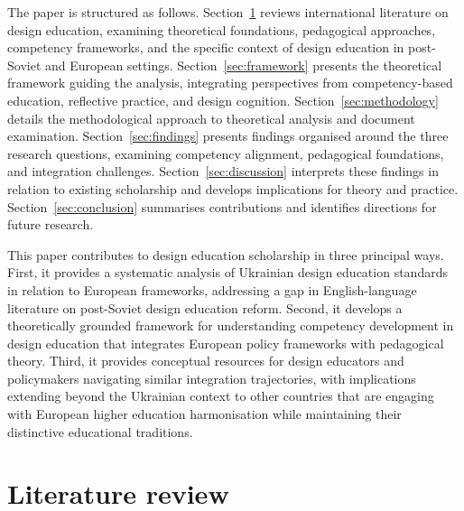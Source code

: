 \documentclass[ed]{acnsart}
\begin{document}
	The paper is structured as follows. Section~\ref{sec:literature} reviews international literature on design education, examining theoretical foundations, pedagogical approaches, competency frameworks, and the specific context of design education in post-Soviet and European settings. Section~\ref{sec:framework} presents the theoretical framework guiding the analysis, integrating perspectives from competency-based education, reflective practice, and design cognition. Section~\ref{sec:methodology} details the methodological approach to theoretical analysis and document examination. Section~\ref{sec:findings} presents findings organised around the three research questions, examining competency alignment, pedagogical foundations, and integration challenges. Section~\ref{sec:discussion} interprets these findings in relation to existing scholarship and develops implications for theory and practice. Section~\ref{sec:conclusion} summarises contributions and identifies directions for future research.
	
	This paper contributes to design education scholarship in three principal ways. First, it provides a systematic analysis of Ukrainian design education standards in relation to European frameworks, addressing a gap in English-language literature on post-Soviet design education reform. Second, it develops a theoretically grounded framework for understanding competency development in design education that integrates European policy frameworks with pedagogical theory. Third, it provides conceptual resources for design educators and policymakers navigating similar integration trajectories, with implications extending beyond the Ukrainian context to other countries that are engaging with European higher education harmonisation while maintaining their distinctive educational traditions.
	
	
	
	\section{Literature review}
	\label{sec:literature}
	
\end{document}
